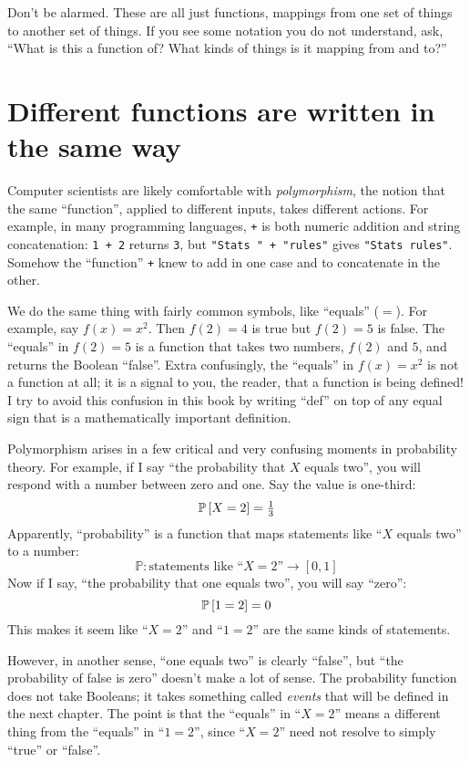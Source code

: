 Don't be alarmed. These are all just functions, mappings from one set of things
to another set of things. If you see some notation you do not understand, ask,
``What is this a function of? What kinds of things is it mapping from and to?''

\section{Different functions are written in the same way}

Computer scientists are likely comfortable with \emph{polymorphism}, the
notion that the same ``function'', applied to different inputs, takes different
actions. For example, in many programming languages, \texttt{+} is both
numeric addition and string concatenation: \texttt{1 + 2} returns \texttt{3},
but \texttt{"Stats " + "rules"} gives \texttt{"Stats rules"}. Somehow the
``function'' \texttt{+} knew to add in one case and to concatenate in the
other.

We do the same thing with fairly common symbols, like ``equals'' ($=$). For
example, say $f(x) = x^2$. Then $f(2) = 4$ is true but $f(2) = 5$ is false.
The ``equals'' in $f(2) = 5$ is a function that takes two numbers, $f(2)$ and
$5$, and returns the Boolean ``false''. Extra confusingly, the ``equals'' in
$f(x) = x^2$ is not a function at all; it is a signal to you, the reader, that
a function is being defined! I try to avoid this confusion in this book by
writing ``def'' on top of any equal sign that is a mathematically important
definition.

Polymorphism arises in a few critical and very confusing moments in probability
theory. For example, if I say ``the probability that $X$ equals two'', you will
respond with a number between zero and one. Say the value is one-third:
\begin{equation*}
\mathbb{P}\left[{X = 2}\right] = \tfrac{1}{3}
\end{equation*}
Apparently, ``probability'' is a function that maps statements like
``$X$ equals two'' to a number:
\begin{equation*}
\mathbb{P} : \text{statements like ``$X=2$''} \to [0, 1]
\end{equation*}
Now if I say, ``the probability that one equals two'', you will say ``zero'':
\begin{equation*}
\mathbb{P}\left[{1 = 2}\right] = 0
\end{equation*}
This makes it seem like ``$X=2$'' and ``$1=2$'' are the same
kinds of statements.

However, in another sense, ``one equals two'' is clearly ``false'', but
``the probability of false is zero'' doesn't make a lot of sense. The probability
function does not take Booleans; it takes something called \emph{events} that
will be defined in the next chapter. The point is that the ``equals'' in ``$X=2$''
means a different thing from the ``equals'' in ``$1=2$'', since ``$X=2$'' need
not resolve to simply ``true'' or ``false''.
